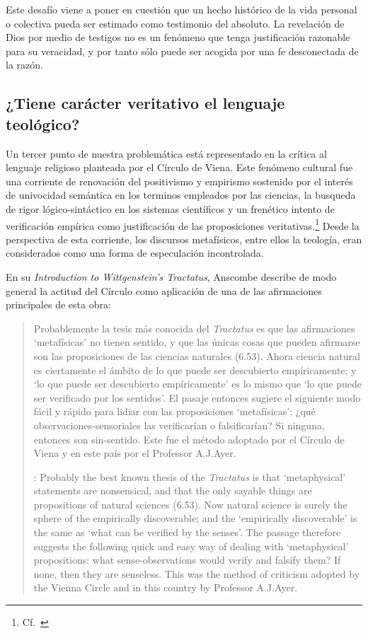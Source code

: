   Este desafío viene a poner en cuestión que un hecho histórico de la vida
  personal o colectiva pueda ser estimado como testimonio del absoluto. La
  revelación de Dios por medio de testigos no es un fenómeno que tenga
  justificación razonable para su veracidad, y por tanto sólo puede ser acogida
  por una fe desconectada de la razón.

\subsection{¿Tiene carácter veritativo el lenguaje teológico?}
Un tercer punto de nuestra problemática está representado en la crítica al
lenguaje religioso planteada por el Círculo de Viena. Este fenómeno cultural fue
una corriente de renovación del positivismo y empirismo sostenido por el interés
de univocidad semántica en los terminos empleados por las ciencias, la busqueda
de rigor lógico-sintáctico en los sistemas científicos y un frenético intento de
verificación empírica como justificación de las proposiciones
veritativas.\footnote{Cf.~\cite[152]{dominguez2009at}} Desde la perspectiva de
esta corriente, los discursos metafísicos, entre ellos la teología, eran
considerados como una forma de especulación incontrolada.

En su \emph{Introduction to Wittgenstein's Tractatus}, Anscombe describe de modo
general la actitud del Círculo como aplicación de una de las afirmaciones
principales de esta obra: \blockquote[{\cite[150]{anscombe1959iwt}}: Probably
the best known thesis of the \emph{Tractatus} is that `metaphysical' statements
are nonsensical, and that the only sayable things are propositions of natural
sciences (6.53). Now natural science is surely the sphere of the empirically
discoverable; and the `empirically discoverable' is the same as `what can be
verified by the senses'. The passage therefore suggests the following quick and
easy way of dealing with `metaphysical' propositions: what sense-observations
would verify and falsify them? If none, then they are senseless. This was the
method of criticism adopted by the Vienna Circle and in this country by
Professor A.J.Ayer.]{Probablemente la tesis más conocida del \emph{Tractatus} es
  que las afirmaciones `metafísicas' no tienen sentido, y que las únicas cosas
  que pueden afirmarse son las proposiciones de las ciencias naturales (6.53).
  Ahora ciencia natural es ciertamente el ámbito de lo que puede ser descubierto
  empíricamente; y `lo que puede ser descubierto empíricamente' es lo mismo que
  `lo que puede ser verificado por los sentidos'. El pasaje entonces sugiere el
  siguiente modo fácil y rápido para lidiar con las proposiciones `metafísicas':
  ¿qué observaciones-sensoriales las verificarían o falsificarían? Si ninguna,
  entonces son sin-sentido. Este fue el método adoptado por el Círculo de Viena
  y en este país por el Professor A.J.Ayer.}

